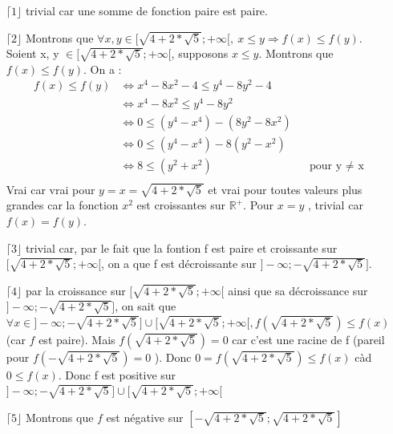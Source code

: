 \documentclass[a4paper, 12pt]{article}
\begin{document}
\begin{itemize}
	\item[\(\lceil 1 \rfloor\)] trivial car une somme de fonction paire est paire.
	\item[\(\lceil 2 \rfloor\)] Montrons que \( \forall x, y \in [ \sqrt{4 + 2 * \sqrt{5}} ; +\infty [, ~ x \leq y \Rightarrow f(x) \leq f(y) \). \newline
	Soient x, y \( \in [ \sqrt{4 + 2 * \sqrt{5}} ; +\infty [ \), supposons \( x \leq y \). Montrons que \( f(x) \leq f(y) \). \newline On a :
	\begin{align*}
		f(x) \leq f(y) &\Leftrightarrow x^4 - 8x^2 - 4 \leq y^4 - 8y^2 - 4 \\
		&\Leftrightarrow x^4 - 8x^2 \leq y^4 - 8y^2 \\
		&\Leftrightarrow 0 \leq (y^4 - x^4) - (8y^2 - 8x^2) \\
		&\Leftrightarrow 0 \leq (y^4 - x^4) - 8(y^2 - x^2) \\
		&\Leftrightarrow 8 \leq (y^2 + x^2) &&\text{pour y $\neq$ x} \\
	\end{align*}
Vrai car vrai pour $ y = x = \sqrt{4+2*\sqrt{5}}$ et vrai pour toutes valeurs plus grandes car la fonction $x^2$ est croissantes sur $\mathbb{R}^+$. Pour $x=y$ , trivial car $f(x)=f(y)$.
	\item[\(\lceil 3 \rfloor\)] trivial car, par le fait que la fontion f est paire et croissante sur \( [ \sqrt{4 + 2 * \sqrt{5}} ; +\infty [ \), on a que f est décroissante sur \( ] -\infty ; -\sqrt{4 + 2 * \sqrt{5}} ] \).
	\item[\(\lceil 4 \rfloor\)] par la croissance sur \( [ \sqrt{4 + 2 * \sqrt{5}} ; +\infty [ \) ainsi que sa décroissance sur \( ] -\infty ; -\sqrt{4 + 2 * \sqrt{5}} ] \), on sait que \( \forall x \in ] -\infty ; -\sqrt{4 + 2 * \sqrt{5}} ] \cup [ \sqrt{4 + 2 * \sqrt{5}} ; +\infty [, f \left( \sqrt{4 + 2 * \sqrt{5}}\right) \leq f \left( x \right) \) (car $f$ est paire). Mais \( f \left( \sqrt{4 + 2 * \sqrt{5}} \right) = 0 \) car c'est une racine de f (pareil pour \( f \left( - \sqrt{4 + 2 * \sqrt{5}} \right) = 0 \) ). \newline
	Donc \( 0 = f \left( \sqrt{4 + 2 * \sqrt{5}} \right) \leq f \left( x \right) \) càd \( 0 \leq f \left( x \right) \). Donc f est positive sur \( ] -\infty ; -\sqrt{4 + 2 * \sqrt{5}} ] \cup [ \sqrt{4 + 2 * \sqrt{5}} ; +\infty [ \)
	\item[\(\lceil 5 \rfloor\)] Montrons que $f$ est négative sur $ [ -\sqrt{4 + 2 * \sqrt{5}} ; \sqrt{4 + 2 * \sqrt{5}} ] $

\end{itemize}
\end{document}
